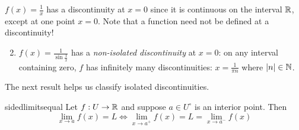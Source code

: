 \begin{examples}{}{}
\exstart $f(x)=\frac 1x$ has a discontinuity at $x=0$ since it is continuous on the interval $\mathbb{R}$, except at one point $x=0$. Note that a function need not be defined at a discontinuity!
\begin{enumerate}\setcounter{enumi}{1}
  \item $f(x)=\frac 1{\sin \frac 1x}$ has a \emph{non-isolated discontinuity} at $x=0$: on any interval containing zero, $f$ has infinitely many discontinuities: $x=\frac 1{\pi n}$ where $\left| n\right|\in\mathbb{N}$.
\end{enumerate}
\end{examples}


The next result helps us classify isolated discontinuities.

\begin{thm}{}{sidedlimitsequal}
Let $f:U\to\mathbb{R}$ and suppose $a\in U^\circ$ is an interior point. Then
\[\lim\limits_{x\to a}f(x)=L \iff \lim\limits_{x\to a^+}f(x)=L=\lim\limits_{x\to a^-}f(x)\]
\end{thm}

